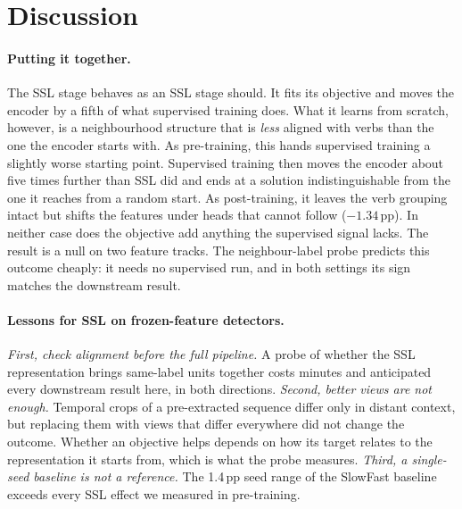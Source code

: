 \documentclass[10pt,a4paper]{article}
\newcommand{\pp}{\,pp}
\begin{document}
\section{Discussion}\label{sec:discussion}

\paragraph{Putting it together.} The SSL stage behaves as an SSL stage should. It fits its
objective and moves the encoder by a fifth of what supervised training does. What it
learns from scratch, however, is a neighbourhood structure that is \emph{less} aligned with
verbs than the one the encoder starts with. As pre-training, this hands supervised training
a slightly worse starting point. Supervised training then moves the encoder about five
times further than SSL did and ends at a solution indistinguishable from the one it reaches
from a random start. As post-training, it leaves the verb grouping intact but
shifts the features under heads that cannot follow ($-1.34$\pp). In neither case does the
objective add anything the supervised signal lacks. The result is a null on two feature tracks. The neighbour-label probe
predicts this outcome cheaply: it needs no supervised run, and in both settings its sign
matches the downstream result.

\paragraph{Lessons for SSL on frozen-feature detectors.} \emph{First, check alignment
before the full pipeline.} A probe of whether the SSL representation brings same-label
units together costs minutes and anticipated every downstream result here, in both
directions. \emph{Second, better views are not enough.} Temporal crops of a pre-extracted
sequence differ only in distant context, but replacing them with views that differ
everywhere did not change the outcome. Whether an objective helps depends on how its target
relates to the representation it starts from, which is what the probe measures. \emph{Third, a single-seed baseline is not a reference.} The 1.4\pp{} seed
range of the SlowFast baseline exceeds every SSL effect we measured in pre-training.
\end{document}
